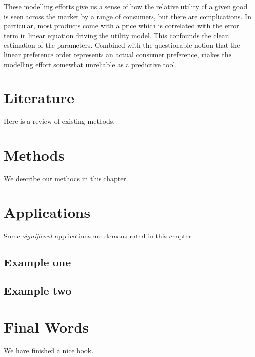 \documentclass[
]{book}
\theoremstyle{definition}
\theoremstyle{definition}
\theoremstyle{definition}
\theoremstyle{remark}
\begin{document}
These modelling efforts give us a sense of how the relative utility of a given good is seen across the market by a range of consumers, but there are complications. In particular, most products come with a price which is correlated with the error term in linear equation driving the utility model. This confounds the clean estimation of the parameters. Combined with the questionable notion that the linear preference order represents an actual consumer preference, makes the modelling effort somewhat unreliable as a predictive tool.

\hypertarget{literature}{%
\chapter{Literature}\label{literature}}

Here is a review of existing methods.

\hypertarget{methods}{%
\chapter{Methods}\label{methods}}

We describe our methods in this chapter.

\hypertarget{applications}{%
\chapter{Applications}\label{applications}}

Some \emph{significant} applications are demonstrated in this chapter.

\hypertarget{example-one}{%
\section{Example one}\label{example-one}}

\hypertarget{example-two}{%
\section{Example two}\label{example-two}}

\hypertarget{final-words}{%
\chapter{Final Words}\label{final-words}}

We have finished a nice book.

  
\end{document}
